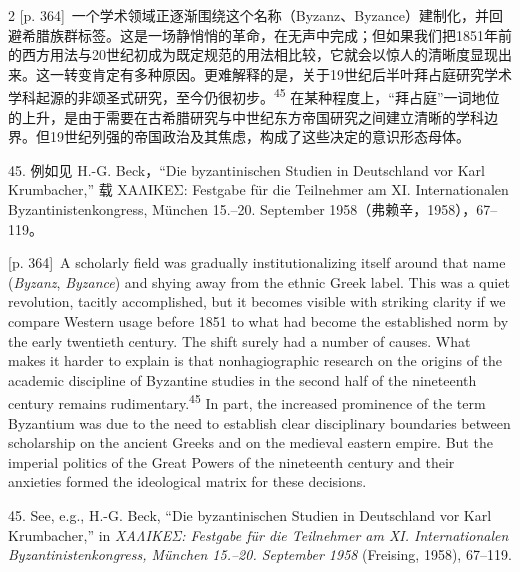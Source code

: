 \documentclass[10pt,a4paper]{article}
\begin{document}
\begin{paracol}{2}
{\scriptsize\color{gray}[p. 364]}\ 一个学术领域正逐渐围绕这个名称（Byzanz、Byzance）建制化，并回避希腊族群标签。这是一场静悄悄的革命，在无声中完成；但如果我们把1851年前的西方用法与20世纪初成为既定规范的用法相比较，它就会以惊人的清晰度显现出来。这一转变肯定有多种原因。更难解释的是，关于19世纪后半叶拜占庭研究学术学科起源的非颂圣式研究，至今仍很初步。\nobreak\textsuperscript{45} 在某种程度上，“拜占庭”一词地位的上升，是由于需要在古希腊研究与中世纪东方帝国研究之间建立清晰的学科边界。但19世纪列强的帝国政治及其焦虑，构成了这些决定的意识形态母体。\par{\small 45. 例如见 H.-G. Beck，“Die byzantinischen Studien in Deutschland vor Karl Krumbacher,” 载 ΧΑΛΙΚΕΣ: Festgabe für die Teilnehmer am XI. Internationalen Byzantinistenkongress, München 15.–20. September 1958（弗赖辛，1958），67–119。\par}
\switchcolumn
{\scriptsize\color{gray}[p. 364]}\ A scholarly field was gradually institutionalizing itself around that name (\textit{Byzanz}, \textit{Byzance}) and shying away from the ethnic Greek label. This was a quiet revolution, tacitly accomplished, but it becomes visible with striking clarity if we compare Western usage before 1851 to what had become the established norm by the early twentieth century. The shift surely had a number of causes. What makes it harder to explain is that nonhagiographic research on the origins of the academic discipline of Byzantine studies in the second half of the nineteenth century remains rudimentary.\nobreak\textsuperscript{45} In part, the increased prominence of the term Byzantium was due to the need to establish clear disciplinary boundaries between scholarship on the ancient Greeks and on the medieval eastern empire. But the imperial politics of the Great Powers of the nineteenth century and their anxieties formed the ideological matrix for these decisions.\par{\small 45. See, e.g., H.-G. Beck, “Die byzantinischen Studien in Deutschland vor Karl Krumbacher,” in \textit{ΧΑΛΙΚΕΣ: Festgabe für die Teilnehmer am XI. Internationalen Byzantinistenkongress, München 15.–20. September 1958} (Freising, 1958), 67–119.\par}
\switchcolumn*

\end{paracol}
\end{document}
